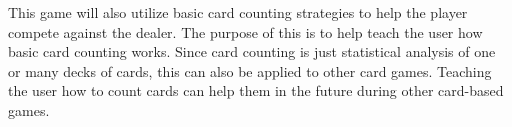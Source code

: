 \documentclass[12pt]{article}
\begin{document}
This game will also utilize basic card counting strategies to help the player compete against the dealer. The purpose of this is to help teach the user how basic card counting works. Since card counting is just statistical analysis of one or many decks of cards, this can also be applied to other card games. Teaching the user how to count cards can help them in the future during other card-based games. 


\newpage
\printbibliography[heading=subbibintoc]
%
%
\end{document}
